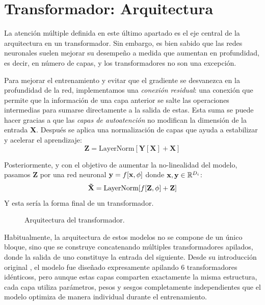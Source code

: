 \section{Transformador: Arquitectura}

La atención múltiple definida en este último apartado es el eje central de la arquitectura en un transformador. Sin embargo, es bien sabido que las redes neuronales suelen mejorar su desempeño a medida que aumentan en profundidad, es decir, en número de capas, y los transformadores no son una excepción.

Para mejorar el entrenamiento y evitar que el gradiente se desvanezca en la profundidad de la red, implementamos una \textit{conexión residual}: una conexión que permite que la información de una capa anterior se salte las operaciones intermedias para sumarse directamente a la salida de estas. Esta suma se puede hacer gracias a que las \textit{capas de autoatención} no modifican la dimensión de la entrada \textbf{X}. Después se aplica una normalización de capas que ayuda a estabilizar y acelerar el aprendizaje:
\begin{equation}
    \mathbf{Z} = \text{LayerNorm}[\mathbf{Y}[\mathbf{X}]+\mathbf{X}]
\end{equation}

Posteriormente, y con el objetivo de aumentar la no-linealidad del modelo, pasamos \textbf{Z} por una red neuronal $ \mathbf{y} = f[\mathbf{x},\phi]$ donde $\mathbf{x},\mathbf{y} \in \mathbb{R}^{D_i}$:
\begin{equation}
    \mathbf{\Tilde{X}} = \text{LayerNorm}[f[\mathbf{Z},\phi] + \mathbf{Z}]
    \label{transformer_ecuacion}
\end{equation}
Y esta sería la forma final de un transformador. 

\begin{figure}[t]
    \centering
    \DiagramaTransformer
    \caption{Arquitectura del transformador.}
    \label{fig:diagrama_transformer}
\end{figure}

Habitualmente, la arquitectura de estos modelos no se compone de un 
único bloque, sino que se construye concatenando múltiples transformadores 
apilados, donde la salida de uno constituye la entrada del siguiente. 
Desde su introducción original \cite{vaswani2017attention_arxiv}, el modelo 
fue diseñado expresamente apilando $6$ transformadores idénticoss, pero 
aunque estas capas comparten exactamente la misma estructura, cada capa utiliza parámetros, pesos y sesgos completamente independientes que el modelo optimiza de manera individual durante el entrenamiento.


